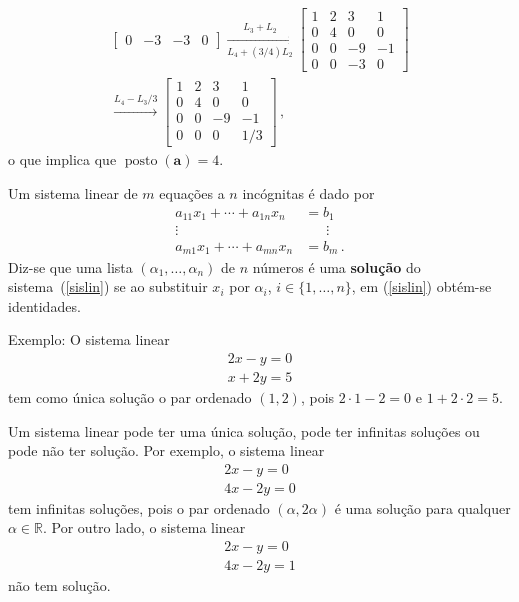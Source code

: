 \documentclass[12pt,a4paper]{report}
\newcommand{\mb}{\mathbf}
\newcommand{\R}{\mathbb{R}}
\DeclareMathOperator{\posto}{posto}
\begin{document}
\begin{enumerate}
\begin{multline*}
\begin{bmatrix}
      0&-3&-3&0
    \end{bmatrix}\xrightarrow[L_4+(3/4)L_2]{L_3+L_2} \begin{bmatrix}
      1&2&3&1\\
      0&4&0&0\\
      0&0&-9&-1\\
      0&0&-3&0
    \end{bmatrix}\\
    \xrightarrow{L_4-L_3/3}\begin{bmatrix}
      1&2&3&1\\
      0&4&0&0\\
      0&0&-9&-1\\
      0&0&0&1/3
    \end{bmatrix}\,,
  \end{multline*}
  o que implica que $\posto(\mb a)=4$.
\end{enumerate}

Um sistema linear de $m$ equações a $n$ incógnitas é dado por
\begin{equation}
  \label{sislin}
  \begin{split}
    a_{11}x_1+\cdots+a_{1n}x_n&=b_1\\
    \vdots\qquad\qquad&\quad\;\;\vdots\\
    a_{m1}x_1+\cdots+a_{mn}x_n&=b_m\,.
  \end{split}
\end{equation}
Diz-se que uma lista $(\alpha_1,\ldots,\alpha_n)$ de $n$ números é uma \textbf{solução} do sistema~(\ref{sislin}) se ao substituir $x_i$ por $\alpha_i$, $i\in\{1,\ldots,n\}$, em (\ref{sislin}) obtém-se identidades.

Exemplo: O sistema linear
\begin{equation*}
  \begin{split}
    2x-y=0\\
    x+2y=5
  \end{split}
\end{equation*}
tem como única solução o par ordenado $(1,2)$, pois $2\cdot 1-2=0$ e $1+2\cdot 2=5$.

Um sistema linear pode ter uma única solução, pode ter infinitas soluções ou pode não ter solução. Por exemplo, o sistema linear
\begin{equation*}
  \begin{split}
    2x-y=0\\
    4x-2y=0
  \end{split}
\end{equation*}
tem infinitas soluções, pois o par ordenado $(\alpha,2\alpha)$ é uma solução para qualquer $\alpha\in\R$. Por outro lado, o sistema linear
\begin{equation*}
  \begin{split}
    2x-y=0\\
    4x-2y=1
  \end{split}
\end{equation*}
não tem solução.
\end{document}
